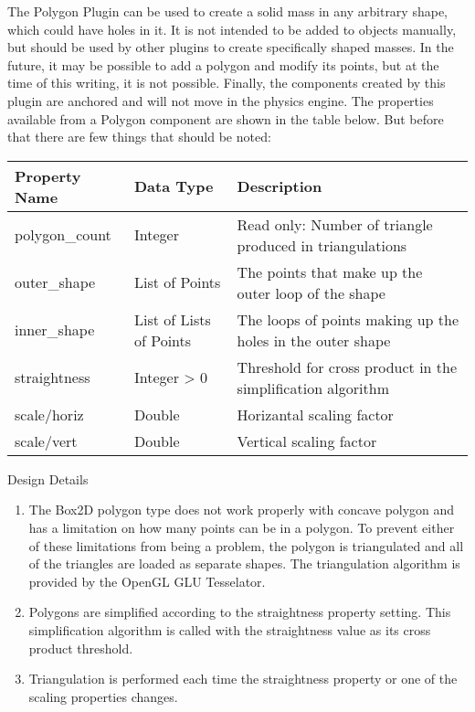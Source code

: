 \documentclass[letterpaper,10pt,english]{sphinxmanual}
\begin{document}

The Polygon Plugin can be used to create a solid mass in any arbitrary shape, which could
have holes in it. It is not intended to be added to objects manually, but should be used
by other plugins to create specifically shaped masses. In the future, it may be
possible to add a polygon and modify its points, but at the time of this writing, it is
not possible. Finally, the components created by this plugin are anchored and will not
move in the physics engine. The properties available from a Polygon component are shown
in the table below. But before that there are few things that should be noted:


\begin{savenotes}\sphinxattablestart
\centering
\begin{tabulary}{\linewidth}[t]{|T|T|T|}
\hline
\sphinxstyletheadfamily 
Property Name
&\sphinxstyletheadfamily 
Data Type
&\sphinxstyletheadfamily 
Description
\\
\hline
polygon\_count
&
Integer
&
Read only: Number of triangle produced in triangulations
\\
\hline
outer\_shape
&
List of Points
&
The points that make up the outer loop of the shape
\\
\hline
inner\_shape
&
List of Lists of Points
&
The loops of points making up the holes in the outer shape
\\
\hline
straightness
&
Integer \textgreater{} 0
&
Threshold for cross product in the simplification algorithm
\\
\hline
scale/horiz
&
Double
&
Horizantal scaling factor
\\
\hline
scale/vert
&
Double
&
Vertical scaling factor
\\
\hline
\end{tabulary}
\par
\sphinxattableend\end{savenotes}

Design Details
\begin{enumerate}
\item {} 
The Box2D polygon type does not work properly with concave polygon and has a limitation on how many points can be in a polygon. To prevent either of these limitations from being a problem, the polygon is triangulated and all of the triangles are loaded as separate shapes. The triangulation algorithm is provided by the OpenGL GLU Tesselator.

\item {} 
Polygons are simplified according to the straightness property setting. This simplification algorithm is called with the straightness value as its cross product threshold.

\item {} 
Triangulation is performed each time the straightness property or one of the scaling properties changes.

\end{enumerate}
\end{document}
